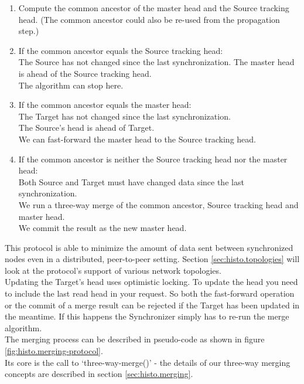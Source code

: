 \begin{enumerate}
\item Compute the common ancestor of the master head and the Source tracking head. (The common ancestor could also be re-used from the propagation step.)
\item If the common ancestor equals the Source tracking head:\\
  The Source has not changed since the last synchronization. The master head is ahead of the Source tracking head.\\
  The algorithm can stop here.
\item If the common ancestor equals the master head:\\
  The Target has not changed since the last synchronization.\\
  The Source's head is ahead of Target.\\
  We can fast-forward the master head to the Source tracking head.
\item If the common ancestor is neither the Source tracking head nor the master head:\\
  Both Source and Target must have changed data since the last synchronization.\\
  We run a three-way merge of the common ancestor, Source tracking head and master head.\\
  We commit the result as the new master head.
\end{enumerate}

This protocol is able to minimize the amount of data sent between synchronized
nodes even in a distributed, peer-to-peer setting.
Section \ref{sec:histo.topologies} will look at the protocol's support of various network topologies.\\

Updating the Target's head uses optimistic locking.
To update the head you need to include the last read head in your request.
So both the fast-forward operation or the commit of a merge result can be rejected if the Target has been updated in the meantime.
If this happens the Synchronizer simply has to re-run the merge algorithm.\\

The merging process can be described in pseudo-code as shown in figure \ref{fig:histo.merging-protocol}.\\
Its core is the call to `three-way-merge()' - the details of our three-way merging concepts are described in section \ref{sec:histo.merging}.\\

